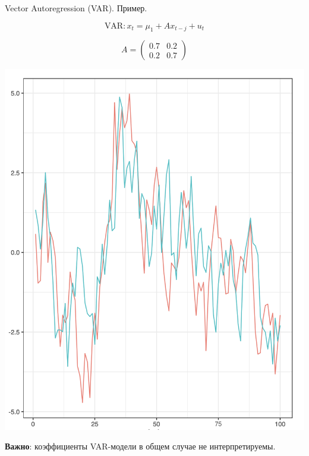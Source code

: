 \begin{frame}{Vector Autoregression (VAR). Пример.}
\noindent
\begin{minipage}{0.4\textwidth}
    $$\text{VAR}: x_t = \mu_1 + A x_{t-j} + u_t $$

    \vspace{0.3cm}
    $$A = \begin{pmatrix}
            0.7 & 0.2 \\
            0.2 & 0.7
            \end{pmatrix}
    $$
    
    \vspace{0.3cm}
\end{minipage}
\hfill
\begin{minipage}{0.5\textwidth}\raggedleft
    \includegraphics[width=0.9\linewidth]{lecture_3/fig/var_example.png}
\end{minipage}
\vspace{0.2cm}
\textbf{Важно}: коэффициенты VAR-модели в общем случае не интерпретируемы.
\end{frame}
